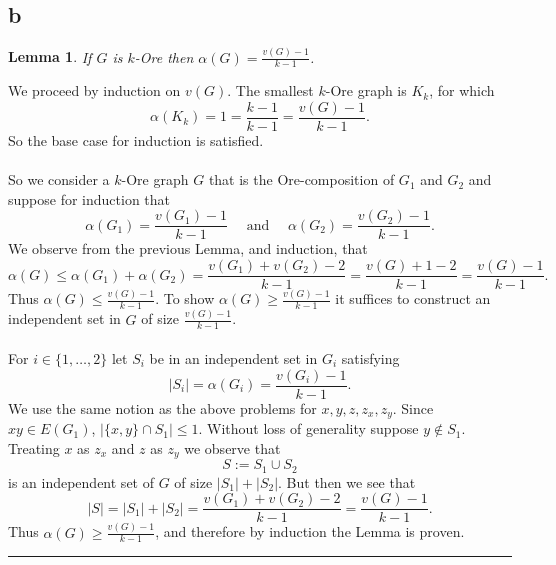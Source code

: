 \documentclass[letterpaper,12pt,oneside,onecolumn]{article}
\newenvironment{proof}{{\bf Proof:  }}{\hfill\rule{2mm}{2mm}}
\newtheorem{lemma}[fact]{Lemma}
\begin{document}
\subsection{b}
\begin{lemma}
	If $G$ is $k$-Ore then $\alpha(G) = \frac{v(G) - 1}{k-1}$.
\end{lemma}
\begin{proof}
	We proceed by induction on $v(G)$. The smallest $k$-Ore graph is $K_k$, for which
	$$\alpha(K_k) = 1 = \frac{k-1}{k-1} = \frac{v(G) -1}{k-1}.$$
	So the base case for induction is satisfied.
	\paragraph{}
	So we consider a $k$-Ore graph $G$ that is the Ore-composition of $G_1$ and $G_2$ and suppose for induction that
	$$\alpha(G_1) = \frac{v(G_1) - 1}{k-1} \quad\text{ and }\quad \alpha(G_2) = \frac{v(G_2) -1}{k-1}.$$
	We observe from the previous Lemma, and induction, that
	$$\alpha(G) \leq \alpha(G_1) + \alpha(G_2) = \frac{v(G_1) +v(G_2)- 2}{k-1} = \frac{v(G) + 1 - 2}{k-1} = \frac{v(G) - 1}{k-1}.$$
	Thus $\alpha(G) \leq \frac{v(G) - 1}{k-1}$. To show $\alpha(G) \geq \frac{v(G) - 1}{k-1}$ it suffices to construct an independent set in $G$ of size $\frac{v(G) - 1}{k-1}$.
	\paragraph{}
	For $i \in \{1, \dots, 2\}$ let $S_i$ be in an independent set in $G_i$ satisfying $$|S_i| = \alpha(G_i) = \frac{v(G_i) - 1}{k-1}.$$ We use the same notion as the above problems for $x,y, z, z_x, z_y$. Since $xy \in E(G_1)$, $|\{x,y\} \cap S_1| \leq 1$. Without loss of generality suppose $y \not\in S_1$. Treating $x$ as $z_x$ and $z$ as $z_y$ we observe that
	$$S := S_1 \cup S_2$$
	is an independent set of $G$ of size $|S_1| + |S_2|$. But then we see that
	$$|S| = |S_1| + |S_2| =  \frac{v(G_1) +v(G_2)- 2}{k-1} = \frac{v(G) - 1}{k-1}.$$
	Thus $\alpha(G) \geq \frac{v(G) - 1}{k-1}$, and therefore by induction the Lemma is proven.
\end{proof}
\end{document}
